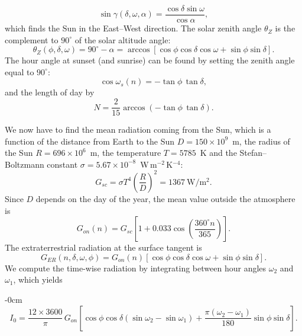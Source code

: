 \documentclass[brainsci,article,submit,moreauthors]{Definitions/mdpi}
\begin{document}
\begin{equation}
\sin\gamma(\delta, \omega, \alpha) = \frac{\cos\delta \sin\omega}{\cos\alpha},
\end{equation}
which finds the Sun in the East--West direction. The solar zenith angle $\theta_{Z}$ is the complement to $90^{\circ}$ of the solar altitude angle:
\begin{equation}
\theta_{Z}(\phi, \delta, \omega) = 90^{\circ} - \alpha = \arccos\left[\cos\phi \cos\delta \cos\omega + \sin\phi \sin\delta\right].
\end{equation}
The hour angle at sunset (and sunrise) can be found by setting the zenith angle equal to $90^{\circ}$:
\begin{equation}
\cos\omega_{s}(n) = -\tan\phi \, \tan\delta,
\end{equation}
and the length of day by
\begin{equation}
N = \frac{2}{15}\arccos\left(-\tan\phi \, \tan\delta\right).
\end{equation}

We now have to find the mean radiation coming from the Sun, which is a function of the distance from Earth to the Sun $D = 150 \times 10^{9}$~m, the radius of the Sun $R = 696 \times 10^{6}$~m, the temperature $T = 5785$~K and the Stefan--Boltzmann constant $\sigma = 5.67 \times 10^{-8}$~W\,m$^{-2}$\,K$^{-4}$:
\begin{equation}
G_{sc} = \sigma T^{4} \left(\frac{R}{D}\right)^{2} = 1367~\mathrm{W/m^{2}}.
\end{equation}
Since $D$ depends on the day of the year, the mean value outside the atmosphere is
\begin{equation}
G_{on}(n) = G_{sc}\left[1 + 0.033\cos\left(\frac{360^{\circ} n}{365}\right)\right].
\end{equation}
The extraterrestrial radiation at the surface tangent is
\begin{equation}
G_{ER}(n, \delta, \omega, \phi) = G_{on}(n)\left[\cos\phi \cos\delta \cos\omega + \sin\phi \sin\delta\right].
\end{equation}
We compute the time-wise radiation by integrating between hour angles $\omega_{2}$ and $\omega_{1}$, which yields
\begin{adjustwidth}{-\extralength}{0cm}
\begin{equation}
I_{0} = \frac{12 \times 3600}{\pi}\, G_{on} \left[\cos\phi \cos\delta \left(\sin\omega_{2} - \sin\omega_{1}\right) + \frac{\pi\left(\omega_{2} - \omega_{1}\right)}{180}\sin\phi \sin\delta\right].
\end{equation}
\end{adjustwidth}
\end{document}
